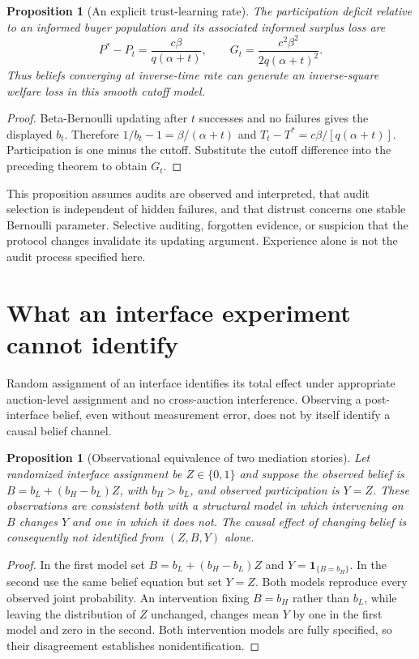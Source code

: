 \documentclass[11pt,a4paper]{article}
\newtheorem{proposition}[theorem]{Proposition}
\theoremstyle{definition}
\theoremstyle{remark}
\newcommand{\ind}{\mathbf{1}}
\begin{document}
\begin{proposition}[An explicit trust-learning rate]
The participation deficit relative to an informed buyer population and its associated informed surplus loss are
\[
 P^*-P_t=\frac{c\beta}{q(\alpha+t)},\qquad
 G_t=\frac{c^2\beta^2}{2q(\alpha+t)^2}.
\]
Thus beliefs converging at inverse-time rate can generate an inverse-square welfare loss in this smooth cutoff model.
\end{proposition}
\begin{proof}
Beta-Bernoulli updating after $t$ successes and no failures gives the displayed $b_t$. Therefore $1/b_t-1=\beta/(\alpha+t)$ and $T_t-T^*=c\beta/[q(\alpha+t)]$. Participation is one minus the cutoff. Substitute the cutoff difference into the preceding theorem to obtain $G_t$.
\end{proof}

This proposition assumes audits are observed and interpreted, that audit selection is independent of hidden failures, and that distrust concerns one stable Bernoulli parameter. Selective auditing, forgotten evidence, or suspicion that the protocol changes invalidate its updating argument. Experience alone is not the audit process specified here.

\section{What an interface experiment cannot identify}
Random assignment of an interface identifies its total effect under appropriate auction-level assignment and no cross-auction interference. Observing a post-interface belief, even without measurement error, does not by itself identify a causal belief channel.

\begin{proposition}[Observational equivalence of two mediation stories]
Let randomized interface assignment be $Z\in\{0,1\}$ and suppose the observed belief is $B=b_L+(b_H-b_L)Z$, with $b_H>b_L$, and observed participation is $Y=Z$. These observations are consistent both with a structural model in which intervening on $B$ changes $Y$ and one in which it does not. The causal effect of changing belief is consequently not identified from $(Z,B,Y)$ alone.
\end{proposition}
\begin{proof}
In the first model set $B=b_L+(b_H-b_L)Z$ and $Y=\ind_{\{B=b_H\}}$. In the second use the same belief equation but set $Y=Z$. Both models reproduce every observed joint probability. An intervention fixing $B=b_H$ rather than $b_L$, while leaving the distribution of $Z$ unchanged, changes mean $Y$ by one in the first model and zero in the second. Both intervention models are fully specified, so their disagreement establishes nonidentification.
\end{proof}
\end{document}
